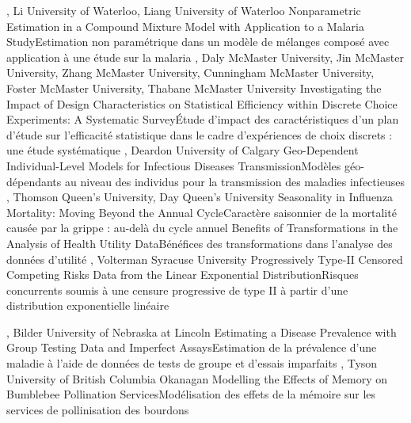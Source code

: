 {
,  {Li}
{University of Waterloo},  {Liang}
{University of Waterloo}
}
{Nonparametric Estimation in a Compound Mixture Model with Application to a Malaria Study}{Estimation non paramétrique dans un modèle de mélanges composé avec application à une étude sur la malaria}
{\bubbleE \enspace \screenE}
{
,  {Daly}
{McMaster University},  {Jin}
{McMaster University},  {Zhang}
{McMaster University},  {Cunningham}
{McMaster University},  {Foster}
{McMaster University},  {Thabane}
{McMaster University}
}
{Investigating the Impact of Design Characteristics on Statistical Efficiency within Discrete Choice Experiments: A Systematic Survey}{Étude d’impact des caractéristiques d’un plan d’étude sur l’efficacité statistique dans le cadre d’expériences de choix discrets : une étude systématique }
{\bubbleE \enspace \screenE}
{
,  {Deardon}
{University of Calgary}
}
{Geo-Dependent Individual-Level Models for Infectious Diseases Transmission}{Modèles géo-dépendants au niveau des individus pour la transmission des maladies infectieuses}
{\bubbleE \enspace \screenE}
{
,  {Thomson}
{Queen's University},  {Day}
{Queen's University}
}
{Seasonality in Influenza Mortality: Moving Beyond the Annual Cycle}{Caractère saisonnier de la mortalité causée par la grippe : au-delà du cycle annuel }
{\bubbleE \enspace \screenE}
{
}
{Benefits of Transformations in the Analysis of Health Utility Data}{Bénéfices des transformations dans l’analyse des données d’utilité}
{\bubbleE \enspace \screenE}
{
,  {Volterman}
{Syracuse University}
}
{Progressively Type-II Censored Competing Risks Data from the Linear Exponential Distribution}{Risques concurrents soumis à une censure progressive de type II à partir d’une distribution exponentielle linéaire }
{\bubbleE \enspace \screenE}


{
,  {Bilder}
{University of Nebraska at Lincoln}
}
{Estimating a Disease Prevalence with Group Testing Data and Imperfect Assays}{Estimation de la prévalence d’une maladie à l’aide de données de tests de groupe et d’essais imparfaits }
{\bubbleE \enspace \screenE}
{
,  {Tyson}
{University of British Columbia Okanagan}
}
{Modelling the Effects of Memory on Bumblebee Pollination Services}{Modélisation des effets de la mémoire sur les services de pollinisation des bourdons }
{\bubbleE \enspace \screenE}

